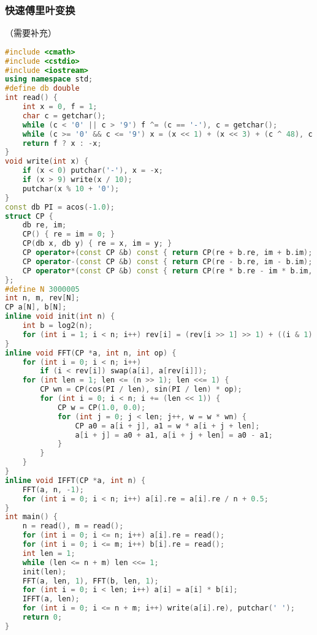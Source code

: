\documentclass[9pt, a4paper, oneside]{book}
\begin{document}
\subsubsection{快速傅里叶变换}
（需要补充）
\begin{lstlisting}[language={C++}]
#include <cmath>
#include <cstdio>
#include <iostream>
using namespace std;
#define db double
int read() {
    int x = 0, f = 1;
    char c = getchar();
    while (c < '0' || c > '9') f ^= (c == '-'), c = getchar();
    while (c >= '0' && c <= '9') x = (x << 1) + (x << 3) + (c ^ 48), c = getchar();
    return f ? x : -x;
}
void write(int x) {
    if (x < 0) putchar('-'), x = -x;
    if (x > 9) write(x / 10);
    putchar(x % 10 + '0');
}
const db PI = acos(-1.0);
struct CP {
    db re, im;
    CP() { re = im = 0; }
    CP(db x, db y) { re = x, im = y; }
    CP operator+(const CP &b) const { return CP(re + b.re, im + b.im); }
    CP operator-(const CP &b) const { return CP(re - b.re, im - b.im); }
    CP operator*(const CP &b) const { return CP(re * b.re - im * b.im, re * b.im + im * b.re); }
};
#define N 3000005
int n, m, rev[N];
CP a[N], b[N];
inline void init(int n) {
    int b = log2(n);
    for (int i = 1; i < n; i++) rev[i] = (rev[i >> 1] >> 1) + ((i & 1) << (b - 1));
}
inline void FFT(CP *a, int n, int op) {
    for (int i = 0; i < n; i++)
        if (i < rev[i]) swap(a[i], a[rev[i]]);
    for (int len = 1; len <= (n >> 1); len <<= 1) {
        CP wn = CP(cos(PI / len), sin(PI / len) * op);
        for (int i = 0; i < n; i += (len << 1)) {
            CP w = CP(1.0, 0.0);
            for (int j = 0; j < len; j++, w = w * wn) {
                CP a0 = a[i + j], a1 = w * a[i + j + len];
                a[i + j] = a0 + a1, a[i + j + len] = a0 - a1;
            }
        }
    }
}
inline void IFFT(CP *a, int n) {
    FFT(a, n, -1);
    for (int i = 0; i < n; i++) a[i].re = a[i].re / n + 0.5;
}
int main() {
    n = read(), m = read();
    for (int i = 0; i <= n; i++) a[i].re = read();
    for (int i = 0; i <= m; i++) b[i].re = read();
    int len = 1;
    while (len <= n + m) len <<= 1;
    init(len);
    FFT(a, len, 1), FFT(b, len, 1);
    for (int i = 0; i < len; i++) a[i] = a[i] * b[i];
    IFFT(a, len);
    for (int i = 0; i <= n + m; i++) write(a[i].re), putchar(' ');
    return 0;
}\end{lstlisting}
\end{document}
